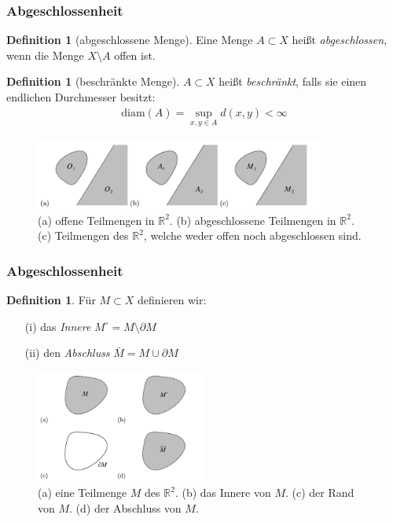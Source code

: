 \documentclass[t, handout]{beamer}
\newcommand{\R}{\mathbb{R}}
\theoremstyle{definition} %
\newtheorem{dfi}[sa]{Definition} %
\begin{document}
\begin{frame}
\frametitle{Abgeschlossenheit}
\begin{dfi}[abgeschlossene Menge]
Eine Menge $A \subset X$ heißt \textit{abgeschlossen}, wenn die Menge $X \setminus A$ offen ist.
\end{dfi}
\pause
\begin{dfi}[beschränkte Menge]
$A \subset X$ heißt \textit{beschränkt}, falls sie einen endlichen Durchmesser besitzt:
\begin{align*}
\text{diam}(A) = \sup_{x,y \in A}{d(x,y)} < \infty
\end{align*}
\end{dfi}
\pause
\centering
\begin{figure}
\includegraphics[width=0.85\textwidth]{pictures/offene-abgeschlossene-mengen.png}
\caption{(a) offene Teilmengen in $\R^2$. (b) abgeschlossene Teilmengen in $\R^2$. \newline(c) Teilmengen des $\R^2$, welche weder offen noch abgeschlossen sind. \cite{OffeneAbgeschlosseneMengen}}
\end{figure}
\end{frame}

\begin{frame}
\frametitle{Abgeschlossenheit}
\begin{dfi}
Für $M \subset X$ definieren wir:
\begin{itemize}
\item[(i)] das \textit{Innere} $M^\circ = M \setminus \partial M$
\item[(ii)] den \textit{Abschluss} $\bar{M} = M \cup \partial M$
\end{itemize}
\end{dfi}
\pause
\centering
\begin{figure}
\includegraphics[width=0.5\textwidth]{pictures/innerer-abschluss.png}
\caption{(a) eine Teilmenge $M$ des $\R^2$. (b) das Innere von $M$. (c) der Rand von $M$. (d) der Abschluss von $M$. \cite{OffeneAbgeschlosseneMengen}}
\end{figure}
\end{frame}
\end{document}
